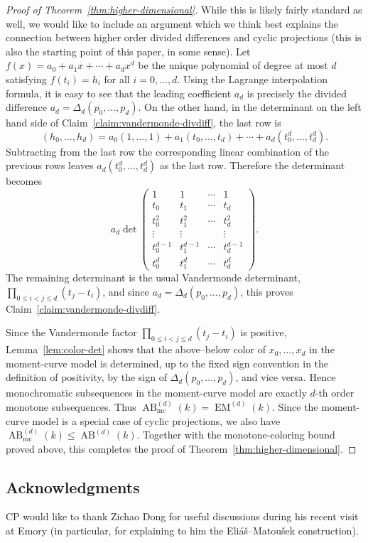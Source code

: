 \documentclass[11pt]{article}
\begin{document}
\begin{proof}[Proof of Theorem~\ref{thm:higher-dimensional}]
While this is likely fairly standard as well, we would like to include an argument which we think best explains the connection between higher order divided differences and cyclic projections (this is also the starting point of this paper, in some sense). Let $f(x)=a_0+a_1x+\cdots+a_dx^d$ be the unique polynomial of degree at most $d$ satisfying $f(t_i)=h_i$ for all
$i=0,\dots,d$. Using the Lagrange interpolation formula, it is easy to see that
the leading coefficient $a_d$ is precisely the divided difference $a_d=\Delta_d(p_0,\dots,p_d)$. On the other hand, in the determinant on the left hand side of
Claim~\ref{claim:vandermonde-divdiff}, the last row is
\[
(h_0,\dots,h_d)
=
a_0(1,\dots,1)+a_1(t_0,\dots,t_d)+\cdots+a_d(t_0^d,\dots,t_d^d).
\]
Subtracting from the last row the corresponding linear combination of the
previous rows leaves $a_d(t_0^d,\dots,t_d^d)$ as the last row. Therefore the
determinant becomes
\[
a_d
\det
\begin{pmatrix}
1&1&\cdots&1\\
t_0&t_1&\cdots&t_d\\
t_0^2&t_1^2&\cdots&t_d^2\\
\vdots&\vdots&&\vdots\\
t_0^{d-1}&t_1^{d-1}&\cdots&t_d^{d-1}\\
t_0^d&t_1^d&\cdots&t_d^d
\end{pmatrix}.
\]
The remaining determinant is the usual Vandermonde determinant,
$\prod_{0\le i<j\le d}(t_j-t_i)$, and since
$a_d=\Delta_d(p_0,\dots,p_d)$, this proves Claim~\ref{claim:vandermonde-divdiff}.

Since the Vandermonde factor $\prod_{0\le i<j\le d}(t_j-t_i)$ is positive,
Lemma~\ref{lem:color-det} shows that the above--below color of
$x_0,\ldots,x_d$ in the moment-curve model is determined, up to the fixed sign
convention in the definition of positivity, by the sign of
$\Delta_d(p_0,\ldots,p_d)$, and vice versa. Hence monochromatic subsequences in
the moment-curve model are exactly $d$-th order monotone subsequences. Thus $\operatorname{AB}^{(d)}_{\mathrm{mc}}(k)=\operatorname{EM}^{(d)}(k)$. Since the moment-curve model is a special case of cyclic projections, we also
have $\operatorname{AB}^{(d)}_{\mathrm{mc}}(k)\le \operatorname{AB}^{(d)}(k)$. Together with the monotone-coloring bound proved above, this completes the proof of Theorem~\ref{thm:higher-dimensional}.
\end{proof}


\subsection*{Acknowledgments}
  CP would like to thank Zichao Dong for useful discussions during his recent visit at Emory (in particular, for explaining to him the Eli\'a\v{s}--Matou\v{s}ek construction). 
\end{document}
